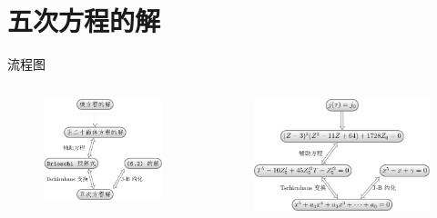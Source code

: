 \documentclass[pdf]{beamer}
\numberwithin{equation}{section}
\theoremstyle{plain}
\theoremstyle{plain}
\theoremstyle{remark}
\begin{document}
\section{五次方程的解}
\begin{frame}{流程图}
	\begin{columns}
		\begin{column}{0.4\textwidth}
		\begin{figure}[ht]
			\centering
			\includegraphics[scale=0.7]{Flowchart/Mainflowchart-1.pdf}
		\end{figure}
	\end{column}
	\begin{column}{0.6\textwidth}
	\begin{figure}[ht]
		\centering
		\includegraphics[scale=0.7]{Flowchart/Mainflowchart-2.pdf}
	\end{figure}
\end{column}
	\end{columns}
\end{frame}
\end{document}
